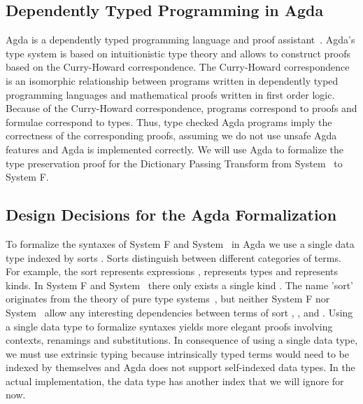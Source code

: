 \subsection{Dependently Typed Programming in Agda}
Agda is a dependently typed programming language and proof assistant~\cite{agda}.
Agda's type system is based on intuitionistic type theory and allows to construct proofs based on the Curry-Howard correspondence. 
The Curry-Howard correspondence is an isomorphic relationship between programs written in dependently typed programming languages and mathematical proofs written in first order logic. 
Because of the Curry-Howard correspondence, programs correspond to proofs and formulae correspond to types. 
Thus, type checked Agda programs imply the correctness of the corresponding proofs, assuming we do not use unsafe Agda features and Agda is implemented correctly. 
We will use Agda to formalize the type preservation proof for the Dictionary Passing Transform from System \Fo\ to System F.

\subsection{Design Decisions for the Agda Formalization}
To formalize the syntaxes of System F and System \Fo\ in Agda we use a single data type  indexed by sorts . 
Sorts distinguish between different categories of terms.
For example, the sort  represents expressions ,  represents types  and  represents kinds. In System F and System \Fo\ there only exists a single kind . 
The name 'sort' originates from the theory of pure type systems~\cite{pts}, but neither System F nor System \Fo\ allow any interesting dependencies between terms of sort , , and .
Using a single data type to formalize syntaxes yields more elegant proofs involving contexts, renamings and substitutions. 
In consequence of using a single data type, we must use extrinsic typing because intrinsically typed terms would need to be indexed by themselves and Agda does not support self-indexed data types. 
In the actual implementation, the data type  has another index  that we will ignore for now.


